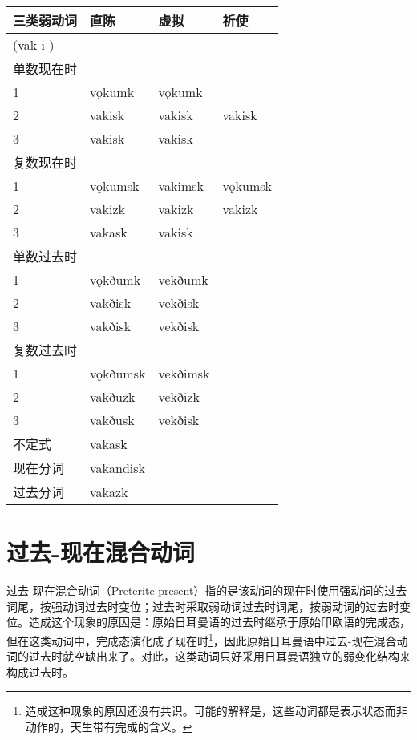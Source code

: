 \begin{longtable}{llll}
  \toprule
  三类弱动词 & 直陈      & 虚拟     & 祈使    \\
  \midrule
  \endhead
  \bottomrule
  \endfoot
  (vak-i-)   &           &          &         \\
  单数现在时 &           &          &         \\
  1          & vǫkumk    & vǫkumk   &         \\
  2          & vakisk    & vakisk   & vakisk  \\
  3          & vakisk    & vakisk   &         \\
  复数现在时 &           &          &         \\
  1          & vǫkumsk   & vakimsk  & vǫkumsk \\
  2          & vakizk    & vakizk   & vakizk  \\
  3          & vakask    & vakisk   &         \\
  单数过去时 &           &          &         \\
  1          & vǫkðumk   & vekðumk  &         \\
  2          & vakðisk   & vekðisk  &         \\
  3          & vakðisk   & vekðisk  &         \\
  复数过去时 &           &          &         \\
  1          & vǫkðumsk  & vekðimsk &         \\
  2          & vakðuzk   & vekðizk  &         \\
  3          & vakðusk   & vekðisk  &         \\
  不定式     & vakask    &          &         \\
  现在分词   & vakandisk &          &         \\
  过去分词   & vakazk    &          &         \\
\end{longtable}

\section{过去-现在混合动词}\label{过去-现在混合动词}

过去-现在混合动词（Preterite-present）指的是该动词的现在时使用强动词的过去词尾，按强动词过去时变位；过去时采取弱动词过去时词尾，按弱动词的过去时变位。造成这个现象的原因是：原始日耳曼语的过去时继承于原始印欧语的完成态，但在这类动词中，完成态演化成了现在时\footnote{造成这种现象的原因还没有共识。可能的解释是，这些动词都是表示状态而非动作的，天生带有完成的含义。}，因此原始日耳曼语中过去-现在混合动词的过去时就空缺出来了。对此，这类动词只好采用日耳曼语独立的弱变化结构来构成过去时。


